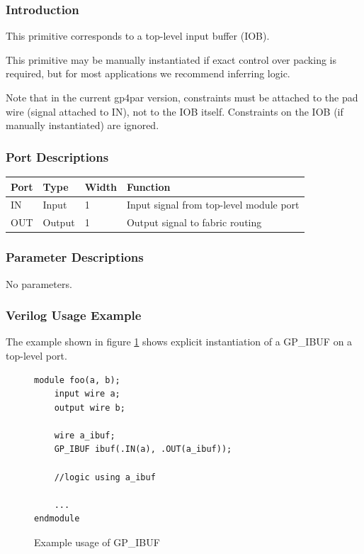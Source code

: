 \documentclass[11pt]{article}
\begin{document}
\subsubsection{Introduction}
This primitive corresponds to a top-level input buffer (IOB).

This primitive may be manually instantiated if exact control over packing is required, but for most applications we 
recommend inferring logic.

Note that in the current gp4par version, constraints must be attached to the pad wire (signal attached to IN), not 
to the IOB itself. Constraints on the IOB (if manually instantiated) are ignored.

\subsubsection{Port Descriptions}

\begin{tabularx}{4in}{|l|l|l|X|}
\hline
{\bfseries Port} & {\bfseries Type} & {\bfseries Width} & {\bfseries Function} \\
\hline
IN & Input & 1 & Input signal from top-level module port \\
\hline
OUT & Output & 1 & Output signal to fabric routing \\
\hline
\end{tabularx}

\subsubsection{Parameter Descriptions}

No parameters.

\subsubsection{Verilog Usage Example}

The example shown in figure \ref{gp-ibuf-example} shows explicit instantiation of a GP\_IBUF on a top-level port.

\begin{figure}[h]
\begin{lstlisting}
module foo(a, b);
	input wire a;
	output wire b;
	
	wire a_ibuf;
	GP_IBUF ibuf(.IN(a), .OUT(a_ibuf));
	
	//logic using a_ibuf
	
	...
endmodule
\end{lstlisting}
\caption{Example usage of GP\_IBUF}
\label{gp-ibuf-example}
\end{figure}
\end{document}
